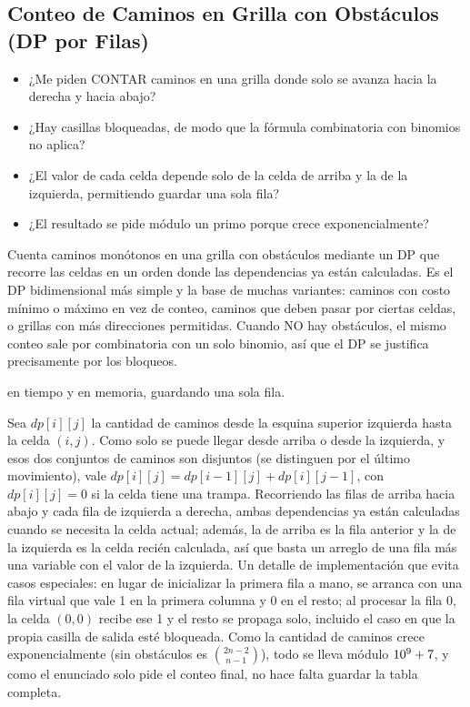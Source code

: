 \subsection{Conteo de Caminos en Grilla con Obstáculos (DP por Filas)}
\label{alg:6-5}


\begin{itemize}
\item ¿Me piden CONTAR caminos en una grilla donde solo se avanza hacia la derecha y hacia abajo?
\item ¿Hay casillas bloqueadas, de modo que la fórmula combinatoria con binomios no aplica?
\item ¿El valor de cada celda depende solo de la celda de arriba y la de la izquierda, permitiendo guardar una sola fila?
\item ¿El resultado se pide módulo un primo porque crece exponencialmente?
\end{itemize}

 Cuenta caminos monótonos en una grilla con obstáculos mediante un DP que recorre las celdas en un orden donde las dependencias ya están calculadas. Es el DP bidimensional más simple y la base de muchas variantes: caminos con costo mínimo o máximo en vez de conteo, caminos que deben pasar por ciertas celdas, o grillas con más direcciones permitidas. Cuando NO hay obstáculos, el mismo conteo sale por combinatoria con un solo binomio, así que el DP se justifica precisamente por los bloqueos.

  en tiempo y  en memoria, guardando una sola fila.

 Sea $dp[i][j]$ la cantidad de caminos desde la esquina superior izquierda hasta la celda $(i,j)$. Como solo se puede llegar desde arriba o desde la izquierda, y esos dos conjuntos de caminos son disjuntos (se distinguen por el último movimiento), vale $dp[i][j] = dp[i-1][j] + dp[i][j-1]$, con $dp[i][j] = 0$ si la celda tiene una trampa. Recorriendo las filas de arriba hacia abajo y cada fila de izquierda a derecha, ambas dependencias ya están calculadas cuando se necesita la celda actual; además, la de arriba es la fila anterior y la de la izquierda es la celda recién calculada, así que basta un arreglo de una fila más una variable con el valor de la izquierda. Un detalle de implementación que evita casos especiales: en lugar de inicializar la primera fila a mano, se arranca con una fila virtual que vale 1 en la primera columna y 0 en el resto; al procesar la fila 0, la celda $(0,0)$ recibe ese 1 y el resto se propaga solo, incluido el caso en que la propia casilla de salida esté bloqueada. Como la cantidad de caminos crece exponencialmente (sin obstáculos es $\binom{2n-2}{n-1}$), todo se lleva módulo $10^{9}+7$, y como el enunciado solo pide el conteo final, no hace falta guardar la tabla completa.

